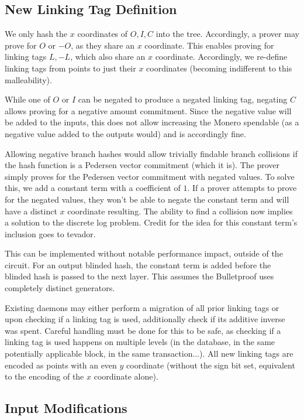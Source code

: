 \documentclass[]{article}
\begin{document}
\subsection{New Linking Tag Definition}

We only hash the $x$ coordinates of $O, I, C$ into the tree. Accordingly, a prover may prove for $O$ or $-O$, as they share an $x$ coordinate. This enables proving for linking tags $L, -L$, which also share an $x$ coordinate. Accordingly, we re-define linking tags from points to just their $x$ coordinates (becoming indifferent to this malleability).

While one of $O$ or $I$ can be negated to produce a negated linking tag, negating $C$ allows proving for a negative amount commitment. Since the negative value will be added to the inputs, this does not allow increasing the Monero spendable (as a negative value added to the outputs would) and is accordingly fine.

Allowing negative branch hashes would allow trivially findable branch collisions if the hash function is a Pedersen vector commitment (which it is). The prover simply proves for the Pedersen vector commitment with negated values. To solve this, we add a constant term with a coefficient of $1$. If a prover attempts to prove for the negated values, they won't be able to negate the constant term and will have a distinct $x$ coordinate resulting. The ability to find a collision now implies a solution to the discrete log problem. Credit for the idea for this constant term's inclusion goes to tevador.

This can be implemented without notable performance impact, outside of the circuit. For an output blinded hash, the constant term is added before the blinded hash is passed to the next layer. This assumes the Bulletproof uses completely distinct generators.

Existing daemons may either perform a migration of all prior linking tags or upon checking if a linking tag is used, additionally check if its additive inverse was spent. Careful handling must be done for this to be safe, as checking if a linking tag is used happens on multiple levels (in the database, in the same potentially applicable block, in the same transaction...). All new linking tags are encoded as points with an even $y$ coordinate (without the sign bit set, equivalent to the encoding of the $x$ coordinate alone).

\subsection{Input Modifications}
\end{document}
